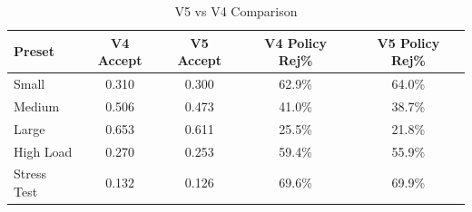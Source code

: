 \begin{table}[h]
\centering
\caption{V5 vs V4 Comparison}
\label{tab:comparison}
\begin{tabular}{lcccc}
\toprule
Preset & V4 Accept & V5 Accept & V4 Policy Rej\% & V5 Policy Rej\% \\
\midrule
Small & 0.310 & 0.300 & 62.9\% & 64.0\% \\
Medium & 0.506 & 0.473 & 41.0\% & 38.7\% \\
Large & 0.653 & 0.611 & 25.5\% & 21.8\% \\
High Load & 0.270 & 0.253 & 59.4\% & 55.9\% \\
Stress Test & 0.132 & 0.126 & 69.6\% & 69.9\% \\
\bottomrule
\end{tabular}
\end{table}
